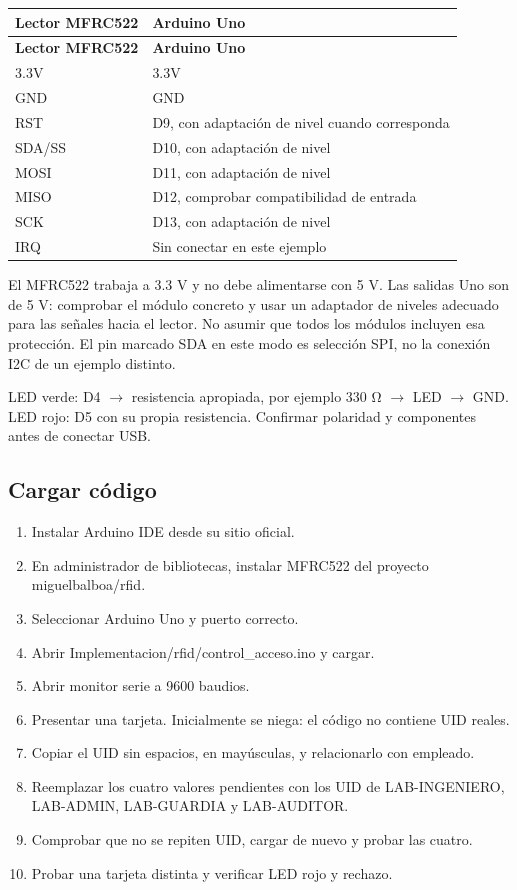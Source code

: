 \documentclass[12pt,a4paper]{article}
\begin{document}
{\small\renewcommand{\arraystretch}{1.2}
\begin{longtable}{p{7.760cm}p{7.760cm}}
\toprule
\textbf{Lector MFRC522} & \textbf{Arduino Uno} \\ \midrule\endfirsthead
\textbf{Lector MFRC522} & \textbf{Arduino Uno} \\ \midrule\endhead
3.3V & 3.3V \\
GND & GND \\
RST & D9, con adaptación de nivel cuando corresponda \\
SDA/SS & D10, con adaptación de nivel \\
MOSI & D11, con adaptación de nivel \\
MISO & D12, comprobar compatibilidad de entrada \\
SCK & D13, con adaptación de nivel \\
IRQ & Sin conectar en este ejemplo \\
\bottomrule\end{longtable}}
El MFRC522 trabaja a 3.3 V y no debe alimentarse con 5 V. Las salidas Uno son de 5 V: comprobar el módulo concreto y usar un adaptador de niveles adecuado para las señales hacia el lector. No asumir que todos los módulos incluyen esa protección. El pin marcado SDA en este modo es selección SPI, no la conexión I2C de un ejemplo distinto.\par
LED verde: D4 \(\rightarrow\) resistencia apropiada, por ejemplo 330 Ω \(\rightarrow\) LED \(\rightarrow\) GND. LED rojo: D5 con su propia resistencia. Confirmar polaridad y componentes antes de conectar USB.\par
{}\subsection*{Cargar código}
\begin{enumerate}
\item Instalar Arduino IDE desde su sitio oficial.
\item En administrador de bibliotecas, instalar MFRC522 del proyecto miguelbalboa/rfid.
\item Seleccionar Arduino Uno y puerto correcto.
\item Abrir \textnormal{Implementacion/\allowbreak{}rfid/\allowbreak{}control\_\allowbreak{}acceso.ino} y cargar.
\item Abrir monitor serie a 9600 baudios.
\item Presentar una tarjeta. Inicialmente se niega: el código no contiene UID reales.
\item Copiar el UID sin espacios, en mayúsculas, y relacionarlo con empleado.
\item Reemplazar los cuatro valores pendientes con los UID de LAB-INGENIERO, LAB-ADMIN, LAB-GUARDIA y LAB-AUDITOR.
\item Comprobar que no se repiten UID, cargar de nuevo y probar las cuatro.
\item Probar una tarjeta distinta y verificar LED rojo y rechazo.
\end{enumerate}
\end{document}

